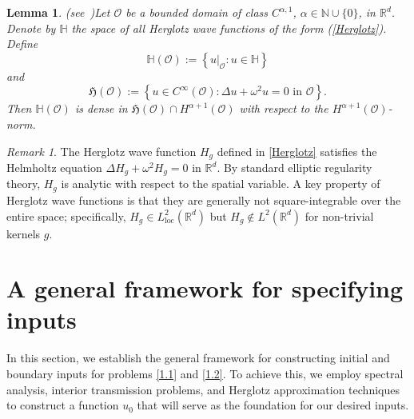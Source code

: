 \documentclass[11pt,reqno,oneside]{amsart}
\numberwithin{equation}{section}
\newtheorem{lemma}[theorem]{Lemma}
\theoremstyle{definition}
\theoremstyle{remark}
\newtheorem{remark}[theorem]{Remark}
\numberwithin{equation}{section}
\begin{document}
	\begin{lemma}(see~\cite{Weck})\label{Herglotz lemma}
		Let $\mathcal{O}$ be a bounded domain of class $C^{\alpha,1}$, $\alpha \in \mathbb{N} \cup \{0\}$, in $\mathbb{R}^d$. Denote by $\mathbb{H}$ the space of all Herglotz wave functions of the form (\ref{Herglotz}). Define
		\[
		\mathbb{H}(\mathcal{O}) := \left\{\left.u\right|_{\mathcal{O}} : u \in \mathbb{H}\right\}
		\]
		and
		\begin{equation}\label{wave number}
			\mathfrak{H}(\mathcal{O}) := \left\{u \in C^{\infty}(\mathcal{O}) : \Delta u + \omega^2 u = 0 \text{ in } \mathcal{O}\right\}.
		\end{equation}
		Then $\mathbb{H}(\mathcal{O})$ is dense in $\mathfrak{H}(\mathcal{O}) \cap H^{\alpha+1}(\mathcal{O})$ with respect to the $H^{\alpha+1}(\mathcal{O})$-norm.
	\end{lemma}
	
	\begin{remark}\label{remark 2.3}
		The Herglotz wave function $H_g$ defined in \eqref{Herglotz} satisfies the Helmholtz equation $\Delta H_g + \omega^2 H_g = 0$ in $\mathbb{R}^d$. By standard elliptic regularity theory, $H_g$ is analytic with respect to the spatial variable. A key property of Herglotz wave functions is that they are generally not square-integrable over the entire space; specifically, $H_g \in L^{2}_{\text{loc}}(\mathbb{R}^d)$ but $H_g \notin L^{2}(\mathbb{R}^d)$ for non-trivial kernels $g$. 
	\end{remark}
	
	
	\section{A general framework for specifying inputs}\label{section 3}
	
	In this section, we establish the general framework for constructing initial and boundary inputs for problems \eqref{1.1} and \eqref{1.2}. To achieve this, we employ spectral analysis, interior transmission problems, and Herglotz approximation techniques to construct a function $u_0$ that will serve as the foundation for our desired inputs.
	
\end{document}
